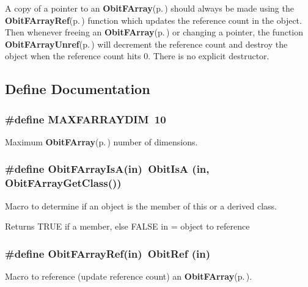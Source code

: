 A copy of a pointer to an {\bf Obit\-FArray}{\rm (p.\,\pageref{structObitFArray})} should always be made using the {\bf Obit\-FArray\-Ref}{\rm (p.\,\pageref{ObitFArray_8h_a1})} function which updates the reference count in the object. Then whenever freeing an {\bf Obit\-FArray}{\rm (p.\,\pageref{structObitFArray})} or changing a pointer, the function {\bf Obit\-FArray\-Unref}{\rm (p.\,\pageref{ObitFArray_8h_a0})} will decrement the reference count and destroy the object when the reference count hits 0. There is no explicit destructor.

\subsection{Define Documentation}
\subsubsection{\setlength{\rightskip}{0pt plus 5cm}\#define MAXFARRAYDIM\ 10}\label{ObitFArray_8h_a3}


Maximum {\bf Obit\-FArray}{\rm (p.\,\pageref{structObitFArray})} number of dimensions. 

\subsubsection{\setlength{\rightskip}{0pt plus 5cm}\#define Obit\-FArray\-Is\-A(in)\ Obit\-Is\-A (in, Obit\-FArray\-Get\-Class())}\label{ObitFArray_8h_a2}


Macro to determine if an object is the member of this or a derived class. 

Returns TRUE if a member, else FALSE in = object to reference 
\subsubsection{\setlength{\rightskip}{0pt plus 5cm}\#define Obit\-FArray\-Ref(in)\ Obit\-Ref (in)}\label{ObitFArray_8h_a1}


Macro to reference (update reference count) an {\bf Obit\-FArray}{\rm (p.\,\pageref{structObitFArray})}. 

